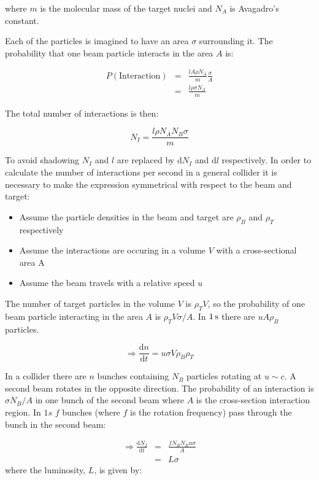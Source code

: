 where $m$ is the molecular mass of the target nuclei and $N_A$ is Avagadro's constant.

Each of the particles is imagined to have an area $\sigma$ surrounding it.  The probability that one beam particle interacts in the area $A$ is:

\begin{eqnarray*}
  P(\textrm{Interaction}) & = & \frac{l A\rho N_A}{m}\frac{\sigma}{A} \\
  & = & \frac{l \rho \sigma N_A}{m}
\end{eqnarray*}

The total number of interactions is then:

\[
  N_I = \frac{l \rho N_A N_B \sigma}{m}
\]

To avoid shadowing $N_I$ and $l$ are replaced by $\mathrm{d}N_I$ and $\mathrm{d}l$ respectively.  In order to calculate the number of interactions per second in a general collider it is necessary to make the expression symmetrical with respect to the beam and target:
\begin{itemize}
  \item Assume the particle densities in the beam and target are $\rho_B$ and $\rho_T$ respectively
  \item Assume the interactions are occuring in a volume $V$ with a cross-sectional area A
  \item Assume the beam travels with a relative speed $u$
\end{itemize}

The number of target particles in the volume $V$ is $\rho_T V$, so the probability of one beam particle interacting in the area $A$ is $\rho_T V \sigma / A$.  In $1\mathrm{\,s}$ there are $uA\rho_B$ particles.

\[
  \Rightarrow \frac{\mathrm{d}n}{\mathrm{d}t} = u\sigma V \rho_B \rho_T
\]

In a collider there are $n$ bunches containing $N_B$ particles rotating at $u \sim c$.  A second beam rotates in the opposite direction.  The probability of an interaction is $\sigma N_B / A$ in one bunch of the second beam where $A$ is the cross-section interaction region.  In $1s$ $f$ bunches (where $f$ is the rotation frequency) pass through the bunch in the second beam:

\begin{eqnarray*}
  \Rightarrow \frac{\mathrm{d}N_I}{\mathrm{d}t} & = & \frac{f N_B N_B n \sigma}{A} \\
  & = & L \sigma
\end{eqnarray*}
where the luminosity, $L$, is given by:

